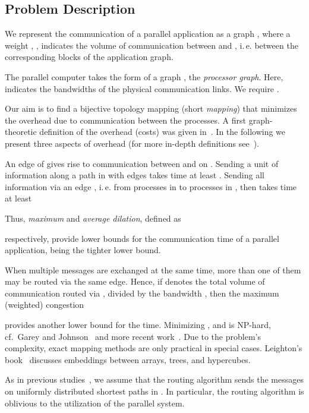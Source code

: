 \documentclass[pdftex]{llncs}
\newcommand{\ie}{i.\,e.\xspace}
\begin{document}
\subsection{Problem Description}
\label{sub:problem}

We represent the communication of a parallel appli\-ca\-tion as a
graph , where a weight , , indicates the volume of communication
between  and , \ie between the corresponding blocks of the
application graph.

The parallel computer takes the form of a graph , the \emph{processor graph}. Here,  indicates the bandwidths of the physical communication links. We
require .

Our aim is to find a bijective topology mapping (short \emph{mapping})
 that minimizes the overhead due to
communication between the processes. A first graph-theoretic
definition of the overhead (costs) was given
in~\cite{Rosenberg1980a}. In the following we present three aspects of
overhead (for more in-depth definitions see~\cite{hoefler-topomap}).

An edge  of  gives rise to communication
between  and  on . Sending a unit of
information along a path  in  with edges 
takes time at least . Sending
all information via an edge , \ie from
processes in  to processes in , then takes time at least


Thus, \emph{maximum} and \emph{average dilation}, defined as
 
respectively, provide lower bounds for the communication time of a
parallel application,  being the tighter lower bound.

When multiple messages are exchanged at the same time, more than one
of them may be routed via the same edge. Hence, if  denotes
the total volume of communication routed via , divided by
the bandwidth , then the maximum (weighted) congestion
 
provides another lower bound for the time. Minimizing ,
 and  is NP-hard, cf.\ Garey and
Johnson~\cite{Garey:1979:CIG:578533} and more recent
work~\cite{hoefler-topomap,ManKim1991246}. Due to the problem's
complexity, exact mapping methods are only practical in special
cases. Leighton's book~\cite{Leighton92introduction} discusses
embeddings between arrays, trees, and hypercubes.

As in previous studies~\cite{hoefler-topomap}, we assume that the
routing algorithm sends the messages on uniformly distributed shortest
paths in . In particular, the routing algorithm is oblivious to
the utilization of the parallel system. 
\end{document}
